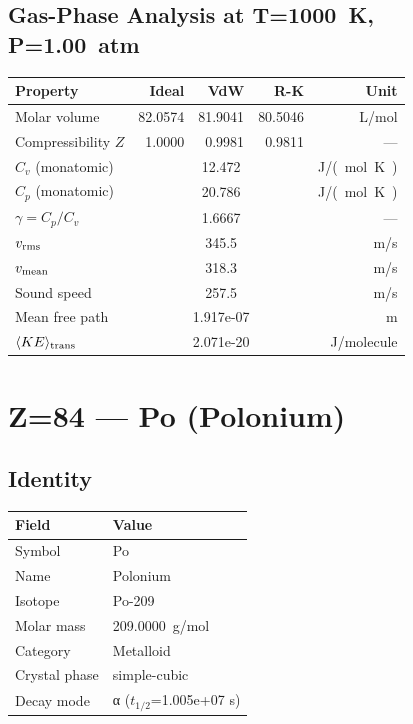 \documentclass[11pt,a4paper]{article}
\begin{document}
\subsection{Gas-Phase Analysis at T=\SI{1000}{K}, P=\SI{1.00}{atm}}
\begin{tabular}{lrrrr}
  \toprule
  Property & Ideal & VdW & R-K & Unit \\
  \midrule
  Molar volume & 82.0574 & 81.9041 & 80.5046 & \si{L/mol} \\
  Compressibility $Z$ & 1.0000 & 0.9981 & 0.9811 & --- \\
  \midrule
  $C_v$ (monatomic) & \multicolumn{3}{c}{12.472} & \si{J/(mol.K)} \\
  $C_p$ (monatomic) & \multicolumn{3}{c}{20.786} & \si{J/(mol.K)} \\
  $\gamma = C_p/C_v$ & \multicolumn{3}{c}{1.6667} & --- \\
  $v_{\rm rms}$ & \multicolumn{3}{c}{345.5} & \si{m/s} \\
  $v_{\rm mean}$ & \multicolumn{3}{c}{318.3} & \si{m/s} \\
  Sound speed & \multicolumn{3}{c}{257.5} & \si{m/s} \\
  Mean free path & \multicolumn{3}{c}{1.917e-07} & \si{m} \\
  $\langle KE \rangle_{\rm trans}$ & \multicolumn{3}{c}{2.071e-20} & \si{J/molecule} \\
  \bottomrule
\end{tabular}

\newpage

\section{Z=84 --- Po (Polonium)}
\label{sec:Z84}

\subsection{Identity}
\begin{tabular}{ll}
  \toprule
  Field & Value \\
  \midrule
  Symbol & Po \\
  Name & Polonium \\
  Isotope & Po-209 \\
  Molar mass & \SI{209.0000}{g/mol} \\
  Category & Metalloid \\
  Crystal phase & simple-cubic \\
  Decay mode & α ($t_{1/2}$=1.005e+07 s) \\
  \bottomrule
\end{tabular}
\end{document}

